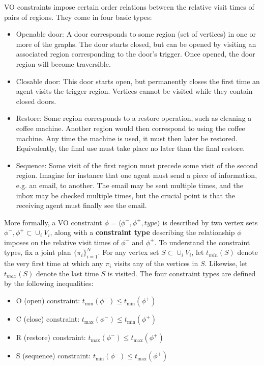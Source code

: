 \documentclass[letterpaper]{article}
\begin{document}
VO constraints impose certain order relations between the relative visit times of pairs of regions. They come in four basic types:

\begin{itemize}
\item Openable door: A door corresponds to some region (set of vertices) in one or more of the graphs. The door starts closed, but can be opened by visiting an associated region corresponding to the door's trigger. Once opened, the door region will become traversible.
\item Closable door: This door starts open, but permanently closes the first time an agent visits the trigger region. Vertices cannot be visited while they contain closed doors.
\item Restore: Some region corresponds to a restore operation, such as cleaning a coffee machine. Another region would then correspond to using the coffee machine. Any time the machine is used, it must then later be restored. Equivalently, the final use must take place no later than the final restore.
\item Sequence: Some visit of the first region must precede some visit of the second region. Imagine for instance that one agent must send a piece of information, e.g. an email, to another. The email may be sent multiple times, and the inbox may be checked multiple times, but the crucial point is that the receiving agent must finally see the email.
\end{itemize}

More formally, a VO constraint $\phi = \langle\phi^-,\phi^+,type\rangle$ is described by two vertex sets $\phi^-,\phi^+\subset \cup_i V_i$, along with a \textbf{constraint type} describing the relationship $\phi$ imposes on the relative visit times of $\phi^-$ and $\phi^+$. To understand the constraint types, fix a joint plan $\{\pi_i\}_{i=1}^N$. For any vertex set $S \subset \cup_i V_i$, let $t_{min}(S)$ denote the very first time at which any $\pi_i$ visits any of the vertices in $S$. Likewise, let $t_{max}(S)$ denote the last time $S$ is visited. The four constraint types are defined by the following inequalities:

\begin{itemize}
\item O (open) constraint: $t_{\min}(\phi^-) \le t_{\min}(\phi^+)$
\item C (close) constraint: $t_{\max}(\phi^-) \le t_{\min}(\phi^+)$
\item R (restore) constraint: $t_{\max}(\phi^-) \le t_{\max}(\phi^+)$
\item S (sequence) constraint: $t_{\min}(\phi^-) \le t_{\max}(\phi^+)$
\end{itemize}
\end{document}
